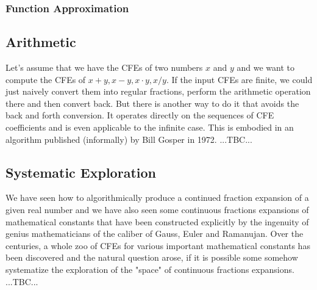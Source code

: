 \subsubsection{Function Approximation}





\subsection{Arithmetic}
Let's assume that we have the CFEs of two numbers $x$ and $y$ and we want to compute the CFEs of $x + y, x - y, x \cdot y, x / y$. If the input CFEs are finite, we could just naively convert them into regular fractions, perform the arithmetic operation there and then convert back. But there is another way to do it that avoids the back and forth conversion. It operates directly on the sequences of CFE coefficients and is even applicable to the infinite case. This is embodied in an algorithm published (informally) by Bill Gosper in 1972. ...TBC...






\subsection{Systematic Exploration}
We have seen how to algorithmically produce a continued fraction expansion of a given real number and we have also seen some continuous fractions expansions of mathematical constants that have been constructed explicitly by the ingenuity of genius mathematicians of the caliber of Gauss, Euler and Ramanujan. Over the centuries, a whole zoo of CFEs for various important mathematical constants has been discovered and the natural question arose, if it is possible some somehow systematize the exploration of the "space" of continuous fractions expansions. ...TBC...

